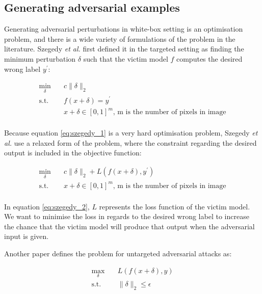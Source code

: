\subsection{Generating adversarial examples}

Generating adversarial perturbations in white-box setting is an optimisation problem, and there is a wide variety of formulations of the problem in the literature. Szegedy \textit{et al.} \cite{szegedy2014intriguing} first defined it in the targeted setting as finding the minimum perturbation $\delta$ such that the victim model $f$ computes the desired wrong label $y^\prime$:

\begin{equation}
\label{eq:szegedy_1}
\begin{aligned}
\min_{\delta} \quad & c\|\delta\|_2\\
\textrm{s.t.} \quad & f(x + \delta) = y^\prime\\
  &x + \delta \in [0,1]^m \textrm{, m is the number of pixels in image}   \\
\end{aligned}
\end{equation}

Because equation \ref{eq:szegedy_1} is a very hard optimisation problem, Szegedy \textit{et al.} \cite{szegedy2014intriguing} use a relaxed form of the problem, where the constraint regarding the desired output is included in the objective function:

\begin{equation}
\label{eq:szegedy_2}
\begin{aligned}
\min_{\delta} \quad & c\|\delta\|_2 + L(f(x + \delta), y^\prime)\\
\textrm{s.t.} \quad& x + \delta \in [0,1]^m \textrm{, m is the number of pixels in image}   \\
\end{aligned}
\end{equation}

In equation \ref{eq:szegedy_2}, $L$ represents the loss function of the victim model. We want to minimise the loss in regards to the desired wrong label to increase the chance that the victim model will produce that output when the adversarial input is given.

Another paper \cite{silva_survey} defines the problem for untargeted adversarial attacks as:

\begin{equation}
\begin{aligned}
\max_{\delta} \quad & L(f(x + \delta), y)\\
\textrm{s.t.} \quad& \|\delta\|_2\leq\epsilon   \\
\end{aligned}
\end{equation}

